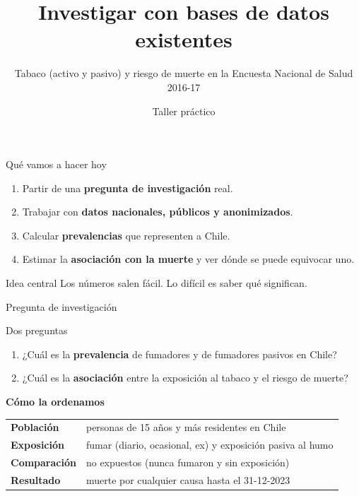 \documentclass[aspectratio=169,11pt]{beamer}
\title{Investigar con bases de datos existentes}
\subtitle{Tabaco (activo y pasivo) y riesgo de muerte en la Encuesta Nacional de Salud 2016-17}
\author{Taller práctico}
\institute{Jornadas de investigación}
\date{}
\begin{document}
\maketitle

\begin{frame}{Qué vamos a hacer hoy}
\begin{enumerate}
  \item Partir de una \textbf{pregunta de investigación} real.
  \item Trabajar con \textbf{datos nacionales, públicos y anonimizados}.
  \item Calcular \textbf{prevalencias} que representen a Chile.
  \item Estimar la \textbf{asociación con la muerte} y ver dónde se puede equivocar uno.
\end{enumerate}
\vspace{.6em}
\begin{alertblock}{Idea central}
Los números salen fácil. Lo difícil es saber \alert{qué significan}.
\end{alertblock}
\end{frame}

\begin{frame}{Pregunta de investigación}
\begin{block}{Dos preguntas}
\begin{enumerate}
  \item ¿Cuál es la \textbf{prevalencia} de fumadores y de fumadores pasivos en Chile?
  \item ¿Cuál es la \textbf{asociación} entre la exposición al tabaco y el riesgo de muerte?
\end{enumerate}
\end{block}
\vspace{.5em}
\textbf{Cómo la ordenamos}\par\vspace{.3em}
\begin{tabular}{@{}ll@{}}
\textbf{Población} & personas de 15 años y más residentes en Chile\\
\textbf{Exposición} & fumar (diario, ocasional, ex) y exposición pasiva al humo\\
\textbf{Comparación} & no expuestos (nunca fumaron y sin exposición)\\
\textbf{Resultado} & muerte por cualquier causa hasta el 31-12-2023
\end{tabular}
\end{frame}
\end{document}
